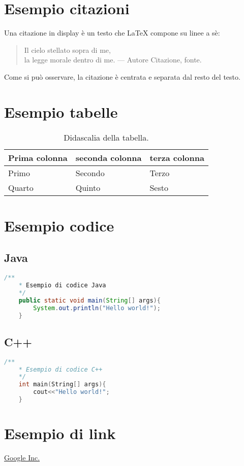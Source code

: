 \section{Esempio citazioni}
Una citazione in display è
un testo che \LaTeX{} compone
su linee a sè:
\begin{quote}\begin{footnotesize} 
 
	Il cielo stellato sopra di me,\\
	la legge morale dentro di me.
	\flushright
		--- Autore Citazione, fonte.
 
\end{footnotesize} 
\end{quote}
Come si può osservare, la
citazione è centrata e
separata dal resto del testo.

\section{Esempio tabelle}
\begin{table}[h]
\begin{tabular}{|l|l|l|}
\hline
\textbf{Prima colonna} & \textbf{seconda colonna} & \textbf{terza colonna} \\
\hline %
Primo & Secondo & Terzo \\
\hline
Quarto & Quinto & Sesto \\
\hline
\end{tabular}
\caption{Didascalia della tabella.}
\end{table}

\section{Esempio codice}
\subsection{Java}
\begin{lstlisting}[language=Java]
	/**
	* Esempio di codice Java
	*/
	public static void main(String[] args){
		System.out.println("Hello world!");
	}
\end{lstlisting}

\subsection{C++}
\begin{lstlisting}[language=C++]
	/**
	* Esempio di codice C++
	*/
	int main(String[] args){
		cout<<"Hello world!";
	}
\end{lstlisting}

\section{Esempio di link}
\href{http://www.google.com/}{Google Inc.}